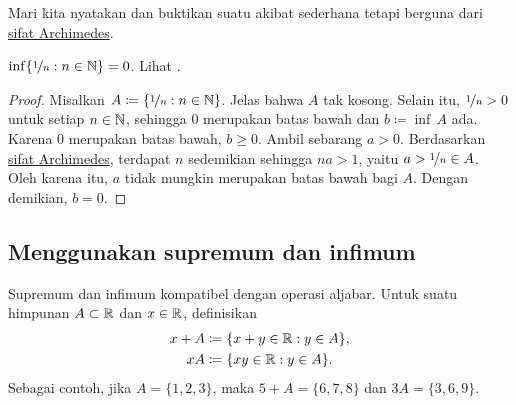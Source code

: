 Mari kita nyatakan dan buktikan suatu akibat sederhana tetapi berguna dari
\hyperref[thm:arch:i]{sifat Archimedes}.

\begin{cor}
$\inf \{ \nicefrac{1}{n} : n \in {\mathbb{N}} \} = 0$.
Lihat .
\end{cor}

\begin{proof}
Misalkan $A \coloneqq \{ \nicefrac{1}{n} : n \in {\mathbb{N}} \}$.  Jelas bahwa $A$ tak kosong.
Selain itu,
$\nicefrac{1}{n} > 0$ untuk setiap $n \in {\mathbb{N}}$, sehingga $0$ merupakan batas bawah
dan $b \coloneqq \inf\, A$ ada.
Karena $0$ merupakan batas bawah, $b \geq 0$.
Ambil sebarang $a > 0$.  Berdasarkan
\hyperref[thm:arch:i]{sifat Archimedes}, terdapat $n$ sedemikian sehingga
$na > 1$, yaitu $a > \nicefrac{1}{n} \in A$.  Oleh karena itu,
$a$ tidak mungkin merupakan batas bawah bagi $A$.  Dengan demikian, $b=0$.
\end{proof}

\begin{myfigureht}
\caption{Himpunan $\{ \nicefrac{1}{n} : n \in \N \}$ dan infimumnya $0$.\label{fig:oneovernset}}
\end{myfigureht}



\subsection{Menggunakan supremum dan infimum}

Supremum dan infimum
kompatibel dengan operasi aljabar.  Untuk suatu himpunan $A \subset {\mathbb{R}}$ dan
$x \in {\mathbb{R}}$, definisikan
\begin{align*}
x + A & \coloneqq \{ x+y \in {\mathbb{R}} : y \in A \} , \\
xA & \coloneqq \{ xy \in {\mathbb{R}} : y \in A \} .
\end{align*}
Sebagai contoh, jika $A = \{ 1,2,3 \}$, maka $5+A = \{ 6,7,8 \}$ dan $3A = \{ 3,6,9
\}$.

